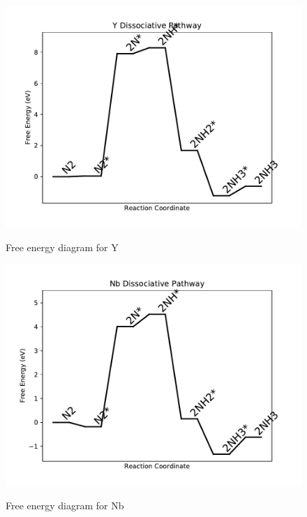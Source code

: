 \documentclass{article}
\begin{document}
\begin{figure}
\includegraphics[width=1\linewidth]{data/plots/Y_dissociative.pdf}
\label{fig:Y_dissociative}
\caption{Free energy diagram for Y}
\end{figure}

\begin{figure}
\includegraphics[width=1\linewidth]{data/plots/Nb_dissociative.pdf}
\label{fig:Nb_dissociative}
\caption{Free energy diagram for Nb}
\end{figure}
\end{document}
